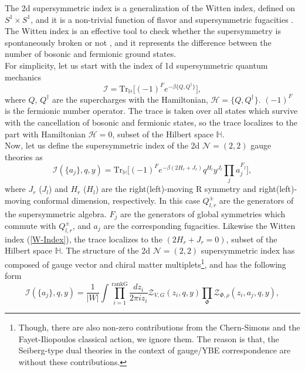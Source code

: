 \documentclass[a4paper,11pt]{article}%
\numberwithin{equation}{section}
\begin{document}
The 2d supersymmetric index is a generalization of the Witten index, defined on $S^{1} \times S^{1}$, and it is a non-trivial function of flavor and supersymmetric fugacities \cite{Nakayama:2011pa,Gadde:2013wq,Benini:2013nda, Gadde:2013ftv}. 
The Witten index is an effective tool to check whether the supersymmetry is spontaneously broken or not \cite{Witten:1982df}, and it represents the difference between the number of bosonic and fermionic ground states. \\For simplicity, let us start with the  index of  1d supersymmetric quantum mechanics 
\begin{equation} \label{W-Index}
\mathcal{I} =\text{Tr}_\mathbb{H}\Big[(-1)^{F}e^{- \beta \big\{Q, Q^\dag\big\}} \Big],
\end{equation}
 where $Q$, $Q^{\dagger}$ are the supercharges with the Hamiltonian, $\mathcal{H}=\{Q, Q^{\dagger}\}$. $(-1)^{F} $ is the fermionic number operator. The trace is taken over all states which survive with the cancellation of bosonic and fermionic states, so the trace localizes to the part with Hamiltonian $ \mathcal{H}=0$, subset of the Hilbert space $\mathbb{H}$.\\
Now, let us define the supersymmetric index of the 2d $\mathcal N=(2,2)$ gauge theories as
\begin{equation}\label{Ind}
\mathcal{I}( \{a_j\},q,y )=\text{Tr}_\mathbb{H}\Big[ (-1)^F e^{-\beta(2H_r+J_r)}q^{H_l}y^{J_l} \prod_j a_j^{F_j} \Big],
\end{equation}
where $J_r$ ($J_l$) and $H_r$ ($H_l$) are the right(left)-moving R symmetry and right(left)-moving conformal dimension, respectively. In this case $Q^{\pm}_{l,r}$ are the generators of the supersymmetric algebra. $F_j$ are the generators of global symmetries which commute with $Q^{\pm}_{l,r}$, and $a_j$ are the corresponding fugacities. Likewise the Witten index (\ref{W-Index}), the trace  localizes to the $(2H_{r}+J_{r}=0)$, subset of the Hilbert space $\mathbb{H}$. The structure of the 2d $\mathcal N=(2,2)$ supersymmetric index has  composed of gauge vector and chiral matter multiplets\footnote{Though, there are also non-zero contributions from the Chern-Simons and the Fayet-Iliopoulos classical action, we ignore them. The reason is that, the Seiberg-type dual theories in the context of gauge/YBE correspondence are without these contributions.}, and has the following form
\begin{equation}\label{ind}
  \mathcal{I}(\{a_j\},q,y)= \frac{1}{|W|}\int \prod_{i=1}^{\text{rankG}}\frac{dz_i}{2\pi iz_i}  \mathcal{Z}_{V,G}(z_i,q,y) \prod_{\Phi} \mathcal{Z}_{\Phi,\rho}(z_i,a_j,q,y),
\end{equation}
\end{document}
